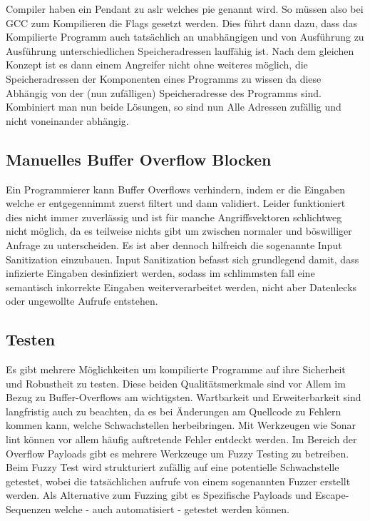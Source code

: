 Compiler haben ein Pendant zu \gls{aslr} welches \gls{pie}
genannt wird. So müssen also bei GCC zum Kompilieren die Flags 
gesetzt werden. Dies führt dann dazu, dass das Kompilierte Programm auch tatsächlich an
unabhängigen und von Ausführung zu Ausführung unterschiedlichen Speicheradressen lauffähig
ist.
Nach dem gleichen Konzept ist es dann einem Angreifer nicht ohne weiteres möglich, die
Speicheradressen der Komponenten eines Programms zu wissen da diese Abhängig
von der (nun zufälligen) Speicheradresse des Programms sind. Kombiniert man nun beide Lösungen,
so sind nun Alle Adressen zufällig und nicht voneinander abhängig.

\subsection{Manuelles Buffer Overflow Blocken}
Ein Programmierer kann Buffer Overflows verhindern, indem er die Eingaben
welche er entgegennimmt zuerst filtert und dann validiert. Leider funktioniert
dies nicht immer zuverlässig und ist für manche Angriffsvektoren schlichtweg nicht
möglich, da es teilweise nichts gibt um zwischen normaler und böswilliger Anfrage zu
unterscheiden. Es ist aber dennoch hilfreich die sogenannte Input Sanitization einzubauen.
Input Sanitization befasst sich grundlegend damit, dass infizierte Eingaben desinfiziert
werden, sodass im schlimmsten fall eine semantisch inkorrekte Eingaben weiterverarbeitet
werden, nicht aber Datenlecks oder ungewollte Aufrufe entstehen. \cite{sanitize} 

\subsection{Testen}
Es gibt mehrere Möglichkeiten um kompilierte Programme auf ihre Sicherheit
und Robustheit zu testen. Diese beiden Qualitätsmerkmale sind vor Allem
im Bezug zu Buffer-Overflows am wichtigsten. Wartbarkeit und Erweiterbarkeit
sind langfristig auch zu beachten, da es bei Änderungen am Quellcode
zu Fehlern kommen kann, welche Schwachstellen herbeibringen.
Mit Werkzeugen wie Sonar lint können vor allem häufig auftretende Fehler entdeckt
werden.
Im Bereich der Overflow Payloads gibt es mehrere Werkzeuge um Fuzzy Testing
zu betreiben. Beim Fuzzy Test wird strukturiert zufällig auf eine
potentielle Schwachstelle getestet, wobei die tatsächlichen aufrufe
von einem sogenannten Fuzzer erstellt werden.
Als Alternative zum Fuzzing gibt es Spezifische Payloads und
Escape-Sequenzen welche - auch automatisiert - getestet werden können.

